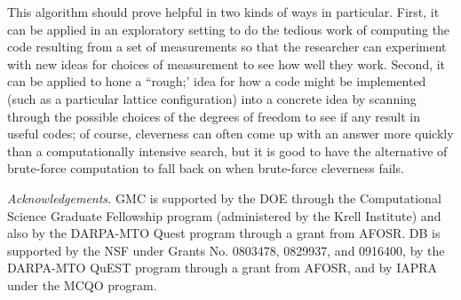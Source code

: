 \documentclass[twocolumn,showpacs,preprintnumbers,amsmath,amssymb,nofootinbib,pra,floatfix]{revtex4-1}
\begin{document}
This algorithm should prove helpful in two kinds of ways in particular.  First, it can be applied in an exploratory setting to do the tedious work of computing the code resulting from a set of measurements so that the researcher can experiment with new ideas for choices of measurement to see how well they work.  Second, it can be applied to hone a ``rough;' idea for how a code might be implemented (such as a particular lattice configuration) into a concrete idea by scanning through the possible choices of the degrees of freedom to see if any result in useful codes; of course, cleverness can often come up with an answer more quickly than a computationally intensive search, but it is good to have the alternative of brute-force computation to fall back on when brute-force cleverness fails.

\emph{Acknowledgements.}  GMC is supported by the DOE through the Computational Science Graduate Fellowship program (administered by the Krell Institute) and also by the DARPA-MTO Quest program through a grant from AFOSR. DB is supported by the NSF under Grants No. 0803478, 0829937, and 0916400, by the DARPA-MTO QuEST program through a grant from AFOSR, and by IAPRA under the MCQO program.


\end{document}

